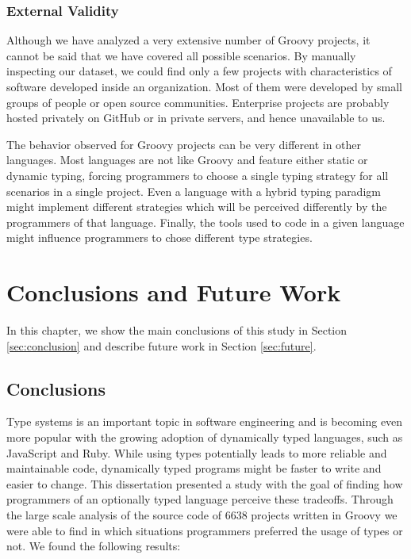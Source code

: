 \documentclass[msc]{ppgccufmg}
\begin{document}
\subsection*{External Validity}
Although we have analyzed a very extensive number of Groovy projects, it cannot be said that we have covered all possible scenarios.
By manually inspecting our dataset, we could find only a few projects with characteristics of software developed inside an organization.
Most of them were developed by small groups of people or open source communities.
Enterprise projects are probably hosted privately on GitHub or in private servers, and hence unavailable to us.

The behavior observed for Groovy projects can be very different in other languages.
Most languages are not like Groovy and feature either static or dynamic typing, forcing programmers to choose a single typing strategy for all scenarios in a single project.
Even a language with a hybrid typing paradigm might implement different strategies which will be perceived differently by the programmers of that language.
Finally, the tools used to code in a given language might influence programmers to chose different type strategies.











%
%
\chapter{Conclusions and Future Work\label{conclusion}}

In this chapter, we show the main conclusions of this study in Section \ref{sec:conclusion} and describe future work in Section \ref{sec:future}.

\section{Conclusions\label{sec:conclusion}}
Type systems is an important topic in software engineering and is becoming even more popular with the growing adoption of dynamically typed languages, such as JavaScript and Ruby.
While using types potentially leads to more reliable and maintainable code, dynamically typed programs might be faster to write and easier to change.
This dissertation presented a study with the goal of finding how programmers of an optionally typed language perceive these tradeoffs.
Through the large scale analysis of the source code of 6638 projects written in Groovy we were able to find in which situations programmers preferred the usage of types or not.
We found the following results:
\end{document}
